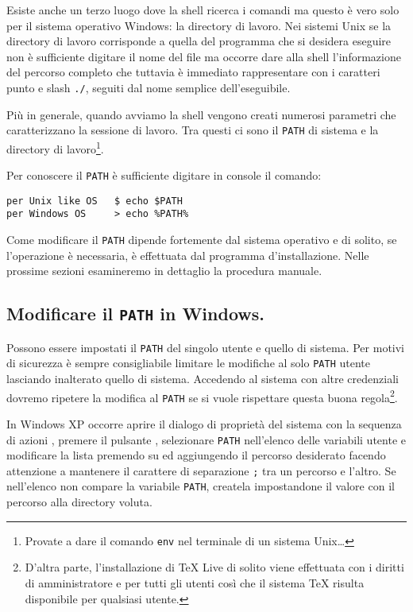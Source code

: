 Esiste anche un terzo luogo dove la shell ricerca i comandi ma questo è vero solo per il sistema operativo Windows: la directory di lavoro. Nei sistemi Unix se la directory di lavoro corrisponde a quella del programma che si desidera eseguire non è sufficiente digitare il nome del file ma occorre dare alla shell l'informazione del percorso completo che tuttavia è immediato rappresentare con i caratteri punto e slash \texttt{./}, seguiti dal nome semplice dell'eseguibile.

Più in generale, quando avviamo la shell vengono creati numerosi parametri che caratterizzano la sessione di lavoro. Tra questi ci sono il \texttt{PATH} di sistema e la directory di lavoro\footnote{Provate a dare il comando \texttt{env} nel terminale di un sistema Unix\dots}.

Per conoscere il \texttt{PATH} è sufficiente digitare in console il comando:
\begin{verbatim}
per Unix like OS   $ echo $PATH
per Windows OS     > echo %PATH%
\end{verbatim}

Come modificare il \texttt{PATH} dipende fortemente dal sistema operativo e di solito, se l'operazione è necessaria, è effettuata dal programma d'installazione. Nelle prossime sezioni esamineremo in dettaglio la procedura manuale.

\subsection{Modificare il \texttt{PATH} in Windows.}

Possono essere impostati il \texttt{PATH} del singolo utente e quello di sistema. Per motivi di sicurezza è sempre consigliabile limitare le modifiche al solo \texttt{PATH} utente lasciando inalterato quello di sistema. Accedendo al sistema con altre credenziali dovremo ripetere la modifica al \texttt{PATH} se si vuole rispettare questa buona regola\footnote{D'altra parte, l'installazione di \TeX{} Live di solito viene effettuata con i diritti di amministratore e per tutti gli utenti così che il sistema \TeX{} risulta disponibile per qualsiasi utente.}.

In Windows XP occorre aprire il dialogo di proprietà del sistema con la sequenza di azioni , premere il pulsante , selezionare \texttt{PATH} nell'elenco delle variabili utente e modificare la lista premendo su  ed aggiungendo il percorso desiderato facendo attenzione a mantenere il carattere di separazione \texttt{;} tra un percorso e l'altro. Se nell'elenco non compare la variabile \texttt{PATH}, createla impostandone il valore con il percorso alla directory voluta.

